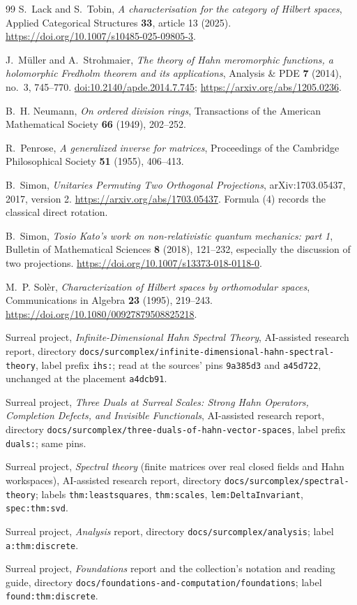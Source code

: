 \documentclass[11pt,letterpaper]{article}
\numberwithin{equation}{section}
\theoremstyle{definition}
\theoremstyle{remark}
\newcommand{\replabel}[1]{\nolinkurl{#1}}
\newcommand{\fn}[1]{\nolinkurl{#1}}
\begin{document}
\begin{thebibliography}{99}
S.~Lack and S.~Tobin, \emph{A characterisation for the category of Hilbert
spaces}, Applied Categorical Structures \textbf{33}, article 13 (2025).
\url{https://doi.org/10.1007/s10485-025-09805-3}.

J.~M\"uller and A.~Strohmaier,
\emph{The theory of Hahn meromorphic functions, a holomorphic
Fredholm theorem and its applications},
Analysis \& PDE \textbf{7} (2014), no.~3, 745--770.
\href{https://doi.org/10.2140/apde.2014.7.745}{doi:10.2140/apde.2014.7.745};
\url{https://arxiv.org/abs/1205.0236}.

B.~H. Neumann, \emph{On ordered division rings},
Transactions of the American Mathematical Society \textbf{66} (1949),
202--252.

R.~Penrose, \emph{A generalized inverse for matrices},
Proceedings of the Cambridge Philosophical Society \textbf{51} (1955),
406--413.

B.~Simon,
\emph{Unitaries Permuting Two Orthogonal Projections},
arXiv:1703.05437, 2017, version 2.
\url{https://arxiv.org/abs/1703.05437}.
Formula (4) records the classical direct rotation.

B.~Simon, \emph{Tosio Kato's work on non-relativistic quantum mechanics:
part 1}, Bulletin of Mathematical Sciences \textbf{8} (2018), 121--232,
especially the discussion of two projections.
\url{https://doi.org/10.1007/s13373-018-0118-0}.

M.~P. Sol\`er, \emph{Characterization of Hilbert spaces by orthomodular
spaces}, Communications in Algebra \textbf{23} (1995), 219--243.
\url{https://doi.org/10.1080/00927879508825218}.

Surreal project, \emph{Infinite-Dimensional Hahn Spectral Theory},
AI-assisted research report, directory
\fn{docs/surcomplex/infinite-dimensional-hahn-spectral-theory}, label prefix
\replabel{ihs:}; read at the sources' pins \texttt{9a385d3} and
\texttt{a45d722}, unchanged at the placement \texttt{a4dcb91}.

Surreal project, \emph{Three Duals at Surreal Scales: Strong Hahn Operators,
Completion Defects, and Invisible Functionals}, AI-assisted research report,
directory \fn{docs/surcomplex/three-duals-of-hahn-vector-spaces}, label
prefix \replabel{duals:}; same pins.

Surreal project, \emph{Spectral theory} (finite matrices over real closed
fields and Hahn workspaces), AI-assisted research report, directory
\fn{docs/surcomplex/spectral-theory}; labels \replabel{thm:leastsquares},
\replabel{thm:scales}, \replabel{lem:DeltaInvariant},
\replabel{spec:thm:svd}.

Surreal project, \emph{Analysis} report, directory
\fn{docs/surcomplex/analysis}; label \replabel{a:thm:discrete}.

Surreal project, \emph{Foundations} report and the collection's notation and
reading guide, directory \fn{docs/foundations-and-computation/foundations};
label \replabel{found:thm:discrete}.

\end{thebibliography}
\end{document}
